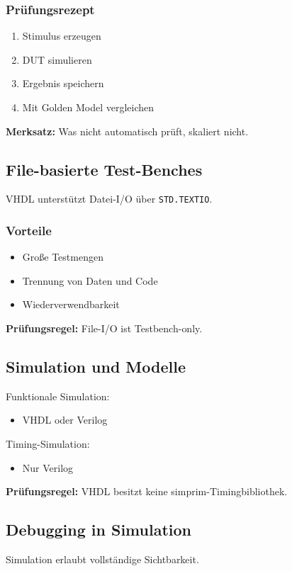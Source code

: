 \documentclass[11pt,a4paper]{article}
\newcommand{\hilite}[1]{\colorbox{yellow!25}{#1}}
\newcommand{\imp}[1]{\textbf{\textcolor{codeemph}{#1}}}
\begin{document}
\subsubsection*{\textcolor{codeemph}{Prüfungsrezept}}
\begin{enumerate}
  \item Stimulus erzeugen
  \item DUT simulieren
  \item Ergebnis speichern
  \item Mit Golden Model vergleichen
\end{enumerate}

\textbf{Merksatz:}  
Was nicht \hilite{automatisch} \hilite{prüft}, \hilite{skaliert} nicht.

\subsection{File-basierte Test-Benches}
VHDL unterstützt Datei-I/O über \texttt{STD.TEXTIO}.

\subsubsection*{Vorteile}
\begin{itemize}
  \item Große Testmengen
  \item Trennung von Daten und Code
  \item Wiederverwendbarkeit
\end{itemize}

\imp{Prüfungsregel:}  
\hilite{File-I}/O ist \hilite{Testbench}-\hilite{only}.

\subsection{Simulation und Modelle}
Funktionale Simulation:
\begin{itemize}
  \item VHDL oder Verilog
\end{itemize}

Timing-Simulation:
\begin{itemize}
  \item Nur Verilog
\end{itemize}

\imp{Prüfungsregel:}  
\hilite{VHDL} \hilite{besitzt} keine simprim-\hilite{Timing}bibliothek.

\subsection{Debugging in Simulation}
Simulation erlaubt vollständige Sichtbarkeit.
\end{document}
